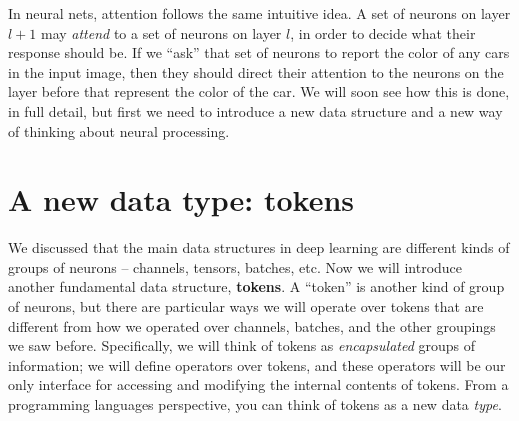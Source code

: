 In neural nets, attention follows the same intuitive idea. A set of neurons on layer $l+1$ may \textit{attend} to a set of neurons on layer $l$, in order to decide what their response should be. If we ``ask'' that set of neurons to report the color of any cars in the input image, then they should direct their attention to the neurons on the layer before that represent the color of the car. We will soon see how this is done, in full detail, but first we need to introduce a new data structure and a new way of thinking about neural processing. 

\section{A new data type: tokens}
We discussed that the main data structures in deep learning are different kinds of groups of neurons -- channels, tensors, batches, etc. Now we will introduce another fundamental data structure, {\bf tokens}. A ``token'' is another kind of group of neurons, but there are particular ways we will operate over tokens that are different from how we operated over channels, batches, and the other groupings we saw before. Specifically,  we will think of tokens as \textit{encapsulated} groups of information; we will define operators over tokens, and these operators will be our only interface for accessing and modifying the internal contents of tokens. From a programming languages perspective, you can think of tokens as a new data \textit{type}.





